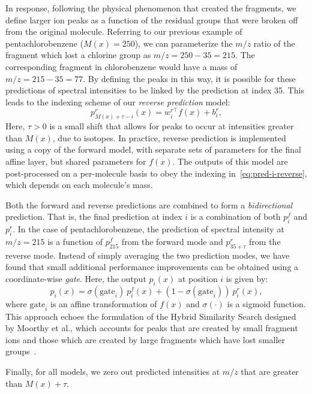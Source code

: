 \documentclass{article}
\begin{document}
In response, following the physical phenomenon that created the fragments, we define larger ion peaks as a function of the residual groups that were broken off from the original molecule. 
Referring to our previous example of pentachlorobenzene ($M(x) = 250$), we can parameterize the $m/z$ ratio of the fragment which lost a chlorine group as $m/z = 250 - 35 = 215$. The corresponding fragment in chlorobenzene would have a mass of $m/z = 215 - 35 =  77$. By defining the peaks in this way, it is possible for these predictions of spectral intensities to be linked by the prediction at index 35.
This leads to the indexing scheme of our \textit{reverse prediction} model:
\begin{equation}
p^r_{M(x) + \tau - i}(x) = w^{r\top}_i f(x) + b^r_i, \label{eq:pred-i-reverse}
\end{equation}
Here, $\tau > 0$ is a small shift that allows for peaks to occur at intensities greater than $M(x)$, due to isotopes. In practice, reverse prediction is implemented using a copy of the forward model, with separate sets of parameters for the final affine layer, but shared parameters for $f(x)$. The outputs of this model are post-processed on a per-molecule basis to obey the indexing in~\eqref{eq:pred-i-reverse}, which depends on each molecule's mass. 

Both the forward and reverse predictions are combined to form a \textit{bidirectional} prediction. That is, the final prediction at index $i$ is a combination of both $p^f_i$ and $p^r_i$. In the case of pentachlorobenzene, the prediction of spectral intensity at $m/z = 215$ is a function of $p^f_{215}$ from the forward mode and $p^r_{35 + \tau}$ from the reverse mode. Instead of simply averaging the two prediction modes, we have found that small additional performance improvements can be obtained using a coordinate-wise \textit{gate}. Here, the output $p_i(x)$ at position $i$ is given by:
\begin{equation}\label{eq:sigmoid_gate}
p_i(x) = \sigma(\text{gate}_i) ~ p^f_i(x) + (1 - \sigma(\text{gate}_i)) ~ p^r_{i}(x),
\end{equation}
where $\text{gate}_i$ is an affine transformation of $f(x)$ and $\sigma(\cdot)$ is a sigmoid function. This approach echoes the formulation of the Hybrid Similarity Search designed by Moorthy et al., which accounts for peaks that are created by small fragment ions and those which are created by large fragments which have lost smaller groups~\cite{moorthy2017combining}.

Finally, for all models, we zero out predicted intensities at $m/z$ that are greater than $M(x) + \tau$.
\end{document}
